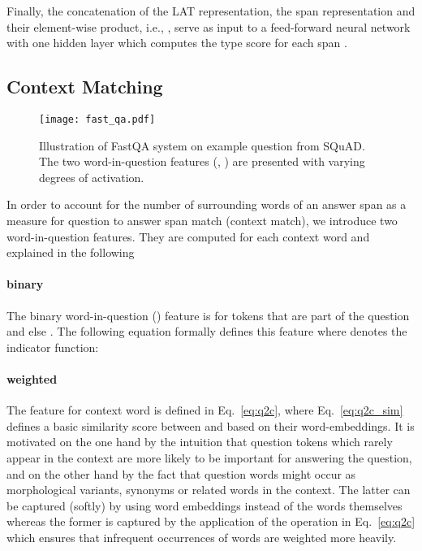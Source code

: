 \documentclass[11pt,a4paper]{article}
\begin{document}
Finally, the concatenation of the LAT representation, the span representation and their element-wise product, i.e., , serve as input to a feed-forward neural network with one hidden layer which computes the type score  for each span .

\subsection{Context Matching}\label{sec:features}

\begin{figure*}[th]
    \centering
    \texttt{[image: fast\_qa.pdf]}
    \caption{Illustration of FastQA system on example question from SQuAD. The two word-in-question features (, ) are presented with varying degrees of activation.}
    \label{fig:fast_qa}
\end{figure*}

In order to account for the number of surrounding words of an answer span as a measure for question to answer span match (context match), we introduce two word-in-question features. They are computed for each context word  and explained in the following

\paragraph{binary} The binary word-in-question () feature is  for tokens that are part of the question and else . The following equation formally defines this feature where  denotes the indicator function:


\paragraph{weighted} The  feature for context word  is defined in Eq.~\ref{eq:q2c}, where Eq.~\ref{eq:q2c_sim} defines a basic similarity score between  and  based on their word-embeddings. It is motivated on the one hand by the intuition that question tokens which rarely appear in the context are more likely to be important for answering the question, and on the other hand by the fact that question words might occur as morphological variants, synonyms or related words in the context. The latter can be captured (softly) by using word embeddings instead of the words themselves whereas the former is captured by the application of the  operation in Eq.~\ref{eq:q2c} which ensures that infrequent occurrences of words are weighted more heavily.
\end{document}
